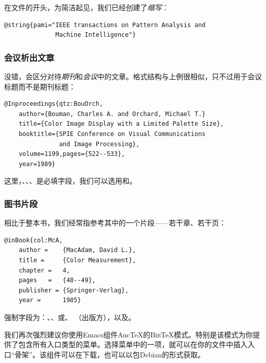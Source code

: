 在文件的开头，为简洁起见，我们已经创建了\emph{缩写}：

\begin{dmd}
\begin{verbatim}
@string{pami="IEEE transactions on Pattern Analysis and
              Machine Intelligence"}
\end{verbatim}
\end{dmd}

\subsubsection{会议析出文章}

没错，\bib 会区分对待\emph{期刊}和\emph{会议}中的文章。格式结构与上例很相似，只不过用于会议标题而不是期刊标题：

\begin{dmd}
\begin{verbatim}
@Inproceedings{qtz:BouOrch,
    author={Bouman, Charles A. and Orchard, Michael T.}
    title={Color Image Display with a Limited Palette Size},
    booktitle={SPIE Conference on Visual Communications
               and Image Processing},
    volume=1199,pages={522--533},
    year=1989}
\end{verbatim}
\end{dmd}

这里，、、、是必填字段，我们可以选用和。

\subsubsection{图书片段}

相比于整本书，我们经常指参考其中的一个片段——若干章、若干页：

\begin{dmd}
\begin{verbatim}
@inBook{col:McA,
    author =    {MacAdam, David L.},
    title =     {Color Measurement},
    chapter =   4,
    pages   =   {48--49},
    publisher = {Springer-Verlag},
    year =      1985}
\end{verbatim}
\end{dmd}

强制字段为：、、或、 （出版方），以及。

\begin{ii}
我们再次强烈建议你使用Emacs组件Auc\TeX 的\textsc{Bib}\TeX 模式。特别是该模式为你提供了包含所有入口类型的菜单。选择菜单中的一项，就可以在你的文件中插入入口“骨架”。该组件可以在下载，也可以以包Debian的形式获取。
\end{ii}

